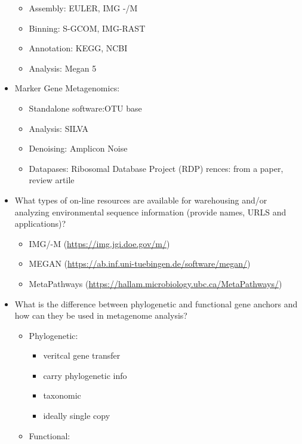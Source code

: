 \documentclass[]{article}
\providecommand{\tightlist}{%
  \setlength{\itemsep}{0pt}\setlength{\parskip}{0pt}}
\begin{document}
\begin{itemize}
  \begin{itemize}
  \tightlist
  \item
    Assembly: EULER, IMG -/M
  \item
    Binning: S-GCOM, IMG-RAST
  \item
    Annotation: KEGG, NCBI
  \item
    Analysis: Megan 5
  \end{itemize}
\item
  Marker Gene Metagenomics:

  \begin{itemize}
  \tightlist
  \item
    Standalone software:OTU base
  \item
    Analysis: SILVA
  \item
    Denoising: Amplicon Noise
  \item
    Datapases: Ribosomal Database Project (RDP) rences: from a paper,
    review artile
  \end{itemize}
\item
  What types of on-line resources are available for warehousing and/or
  analyzing environmental sequence information (provide names, URLS and
  applications)?

  \begin{itemize}
  \tightlist
  \item
    IMG/-M (\url{https://img.jgi.doe.gov/m/})
  \item
    MEGAN (\url{https://ab.inf.uni-tuebingen.de/software/megan/})
  \item
    MetaPathways
    (\url{https://hallam.microbiology.ubc.ca/MetaPathways/})
  \end{itemize}
\item
  What is the difference between phylogenetic and functional gene
  anchors and how can they be used in metagenome analysis?

  \begin{itemize}
  \tightlist
  \item
    Phylogenetic:

    \begin{itemize}
    \tightlist
    \item
      veritcal gene transfer
    \item
      carry phylogenetic info
    \item
      taxonomic
    \item
      ideally single copy
    \end{itemize}
  \item
    Functional:


\end{itemize}
\end{itemize}
\end{document}

